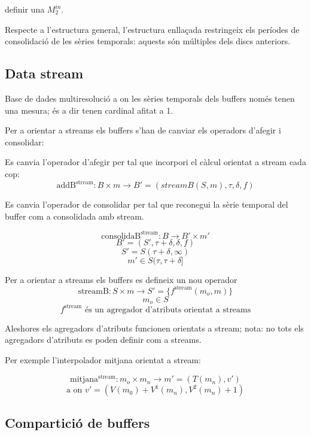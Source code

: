
definir una $M^{in}_2$.





Respecte a l'estructura general, l'estructura enllaçada restringeix
els períodes de consolidació de les sèries temporals: aquests són
múltiples dels discs anteriors.



\subsection{Data stream}



Base de dades multiresolució a on les sèries temporals dels buffers
només tenen una mesura; és a dir tenen cardinal afitat a 1.


Per a orientar a streams els buffers s'han de canviar els operadors
d'afegir i consolidar:

Es canvia l'operador d'afegir per tal que incorpori el càlcul orientat
a stream cada cop:
\[
\text{addB}^{\text{stream}}: B \times m \longrightarrow B' =
(streamB(S,m),\tau,\delta,f)
\]

Es canvia l'operador de consolidar per tal que reconegui la sèrie
temporal del buffer com a consolidada amb stream.

  \[
  \text{consolidaB}^{\text{stream}}: B \longrightarrow B' \times m'
  \]
  \[
  B'= (S',\tau+\delta,\delta,f)
  \]
  \[
  S' = S(\tau+\delta,\infty)
  \]
  \[
  m' \in S(\tau,\tau+\delta] 
  \]


Per a orientar a streams els buffers es defineix un nou operador
\[
\text{streamB}: S \times m \longrightarrow S' = \{f^{\text{stream}}(m_o,m)\}
\]
\[
m_o \in S
\]
\[
f^{\text{stream}} \text{ és un agregador d'atributs orientat a streams}
\]
 

Aleshores els agregadors d'atributs funcionen orientats a stream;
nota: no tots els agregadors d'atributs es poden definir com a
streams.


Per exemple l'interpolador mitjana orientat a stream:

\[
\text{mitjana}^{\text{stream}}: m_o \times m_n \longrightarrow m' = (T(m_n),v')
\]
\[
\text{a on } v' = (V(m_0) + V^1(m_n), V^2(m_n) + 1 )
\]






\subsection{Compartició de buffers}


